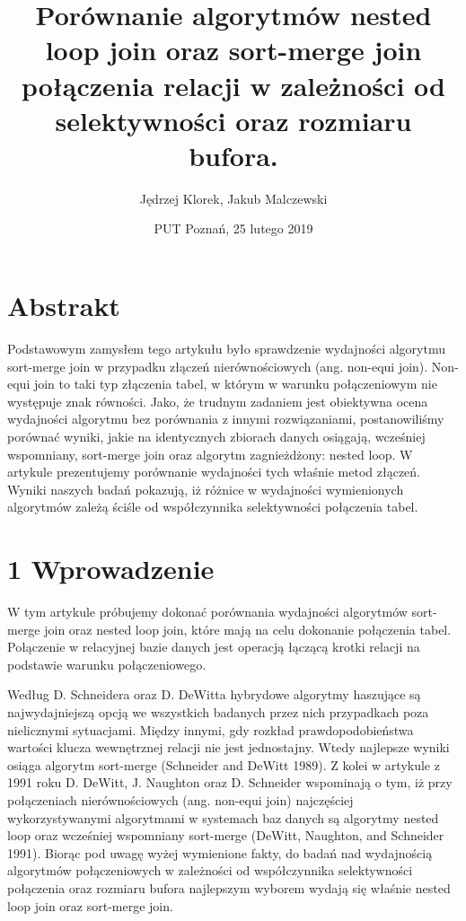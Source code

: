 \documentclass[]{article}
\title{Porównanie algorytmów nested loop join oraz sort-merge join połączenia
relacji w zależności od selektywności oraz rozmiaru bufora.}
\author{Jędrzej Klorek, Jakub Malczewski}
\date{PUT Poznań, 25 lutego 2019}
\begin{document}
\maketitle

\section{Abstrakt}\label{abstrakt}

Podstawowym zamysłem tego artykułu było sprawdzenie wydajności algorytmu
sort-merge join w przypadku złączeń nierównościowych (ang. non-equi
join). Non-equi join to taki typ złączenia tabel, w którym w warunku
połączeniowym nie występuje znak równości. Jako, że trudnym zadaniem
jest obiektywna ocena wydajności algorytmu bez porównania z innymi
rozwiązaniami, postanowiliśmy porównać wyniki, jakie na identycznych
zbiorach danych osiągają, wcześniej wspomniany, sort-merge join oraz
algorytm zagnieżdżony: nested loop. W artykule prezentujemy porównanie
wydajności tych właśnie metod złączeń. Wyniki naszych badań pokazują, iż
różnice w wydajności wymienionych algorytmów zależą ściśle od
współczynnika selektywności połączenia tabel.

\section{1 Wprowadzenie}\label{wprowadzenie}

W tym artykule próbujemy dokonać porównania wydajności algorytmów
sort-merge join oraz nested loop join, które mają na celu dokonanie
połączenia tabel. Połączenie w relacyjnej bazie danych jest operacją
łączącą krotki relacji na podstawie warunku połączeniowego. \vspace{2mm}

Według D. Schneidera oraz D. DeWitta hybrydowe algorytmy haszujące są
najwydajniejszą opcją we wszystkich badanych przez nich przypadkach poza
nielicznymi sytuacjami. Między innymi, gdy rozkład prawdopodobieństwa
wartości klucza wewnętrznej relacji nie jest jednostajny. Wtedy
najlepsze wyniki osiąga algorytm sort-merge (Schneider and DeWitt 1989).
Z kolei w artykule z 1991 roku D. DeWitt, J. Naughton oraz D. Schneider
wspominają o tym, iż przy połączeniach nierównościowych (ang. non-equi
join) najczęściej wykorzystywanymi algorytmami w systemach baz danych są
algorytmy nested loop oraz wcześniej wspomniany sort-merge (DeWitt,
Naughton, and Schneider 1991). Biorąc pod uwagę wyżej wymienione fakty,
do badań nad wydajnością algorytmów połączeniowych w zależności od
współczynnika selektywności połączenia oraz rozmiaru bufora najlepszym
wyborem wydają się właśnie nested loop join oraz sort-merge join.
\vspace{2mm}
\end{document}
